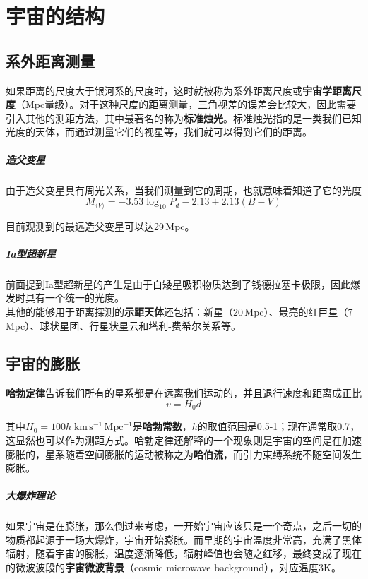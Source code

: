 \documentclass[openany]{ctexbook}
\begin{document}
\chapter{宇宙的结构}
\section{系外距离测量}
如果距离的尺度大于银河系的尺度时，这时就被称为系外距离尺度或\textbf{宇宙学距离尺度}（Mpc量级）。对于这种尺度的距离测量，三角视差的误差会比较大，因此需要引入其他的测距方法，其中最著名的称为\textbf{标准烛光}。标准烛光指的是一类我们已知光度的天体，而通过测量它们的视星等，我们就可以得到它们的距离。

\paragraph{造父变星}
由于造父变星具有周光关系，当我们测量到它的周期，也就意味着知道了它的光度
\begin{equation}
  M_{\langle V\rangle}=-3.53\log_{10}P_d-2.13+2.13(B-V)
\end{equation}

目前观测到的最远造父变星可以达29\,Mpc。

\paragraph{Ia型超新星}
前面提到Ia型超新星的产生是由于白矮星吸积物质达到了钱德拉塞卡极限，因此爆发时具有一个统一的光度。\mbox{}\\

其他的能够用于距离探测的\textbf{示距天体}还包括：新星（20\,Mpc）、最亮的红巨星（7\,Mpc）、球状星团、行星状星云和塔利-费希尔关系等。

\section{宇宙的膨胀}
\textbf{哈勃定律}告诉我们所有的星系都是在远离我们运动的，并且退行速度和距离成正比
\begin{equation}
  v=H_0d
\end{equation}

其中$H_0=100h\;\mathrm{km\,s^{-1}\,Mpc^{-1}}$是\textbf{哈勃常数}，$h$的取值范围是0.5-1；现在通常取0.7，这显然也可以作为测距方式。哈勃定律还解释的一个现象则是宇宙的空间是在加速膨胀的，星系随着空间膨胀的运动被称之为\textbf{哈伯流}，而引力束缚系统不随空间发生膨胀。

\paragraph{大爆炸理论}
如果宇宙是在膨胀，那么倒过来考虑，一开始宇宙应该只是一个奇点，之后一切的物质都起源于一场大爆炸，宇宙开始膨胀。而早期的宇宙温度非常高，充满了黑体辐射，随着宇宙的膨胀，温度逐渐降低，辐射峰值也会随之红移，最终变成了现在的微波波段的\textbf{宇宙微波背景}（cosmic microwave background），对应温度3\;K。
\end{document}
